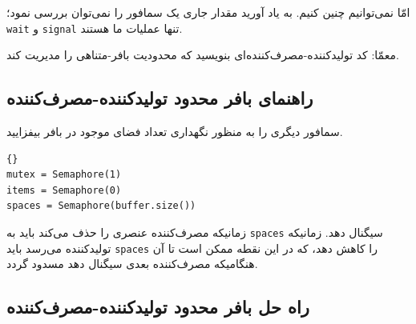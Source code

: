 \documentclass{book}
\newcommand{\clearemptydoublepage}{\newpage\cleardoublepage}
\begin{document}
    امّا نمی‌توانیم چنین کنیم. به یاد آورید مقدار جاری یک سمافور را نمی‌توان بررسی نمود؛ {\tt wait} و {\tt signal} تنها  عملیات ما هستند. 
    
    معمّا: کد تولیدکننده-مصرف‌کننده‌ای بنویسید که محدودیت بافر-متناهی را مدیریت کند. 
    

\clearemptydoublepage
\subsection{ راهنمای بافر محدود تولیدکننده-مصرف‌کننده }

    سمافور دیگری را به منظور نگهداری تعداد فضای موجود در بافر  بیفزایید. 
\begin{latin}
\begin{latin}
\begin{lstlisting}[title=\rl{مقداردهی اولیه بافر محدود تولیدکننده-مصرف‌کننده}]{}
mutex = Semaphore(1)
items = Semaphore(0)
spaces = Semaphore(buffer.size())
\end{lstlisting}
\end{latin}
\end{latin}

    زمانیکه مصرف‌کننده عنصری را حذف می‌کند باید به {\tt spaces} سیگنال دهد. 
    زمانیکه تولیدکننده می‌رسد باید {\tt spaces} را کاهش دهد، که در این نقطه ممکن است تا آن هنگامیکه مصرف‌کننده بعدی سیگنال دهد مسدود گردد. 


\clearemptydoublepage
\subsection{ راه حل بافر محدود تولیدکننده-مصرف‌کننده }
\end{document}
